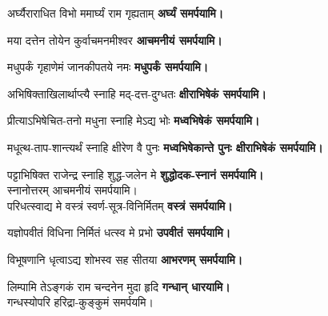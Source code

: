 \begin{center}
{अर्घ्यैराराधित विभो ममार्घ्यं राम गृह्यताम्}
\textbf{\devAya{} अर्घ्यं समर्पयामि।\\}

{मया दत्तेन तोयेन कुर्वाचमनमीश्वर}
\textbf{\devAya{} आचमनीयं समर्पयामि।\\}

{मधुपर्कं गृहाणेमं जानकीपतये नमः}
\textbf{\devAya{} मधुपर्कं समर्पयामि।\\}

{अभिषिक्ताखिलार्थाप्त्यै स्नाहि मद्-दत्त-दुग्धतः}
\textbf{\devAya{} क्षीराभिषेकं समर्पयामि।\\}

{प्रीत्याऽभिषेचित-तनो मधुना स्नाहि मेऽद्य भोः}
\textbf{\devAya{} मध्वभिषेकं समर्पयामि।\\}

{मधूत्थ-ताप-शान्त्यर्थं स्नाहि क्षीरेण वै पुनः}
\textbf{\devAya{} मध्वभिषेकान्ते पुनः क्षीराभिषेकं समर्पयामि।\\}

{पट्टाभिषिक्त राजेन्द्र स्नाहि शुद्ध-जलेन मे}
\textbf{\devAya{} शुद्धोदक-स्नानं समर्पयामि।\\}
स्नानोत्तरम् आचमनीयं समर्पयामि।\\

{परिधत्स्वाद्य मे वस्त्रं स्वर्ण-सूत्र-विनिर्मितम्}
\textbf{\devAya{} वस्त्रं समर्पयामि।\\}

{यज्ञोपवीतं विधिना निर्मितं धत्स्व मे प्रभो}
\textbf{\devAya{} उपवीतं समर्पयामि।\\}

{विभूषणानि धृत्वाऽद्य शोभस्व सह सीतया}
\textbf{\devAya{} आभरणम् समर्पयामि।\\}

{लिम्पामि तेऽङ्गकं राम चन्दनेन मुदा हृदि}
\textbf{\devAya{} गन्धान् धारयामि।\\}
गन्धस्योपरि हरिद्रा-कुङ्कुमं समर्पयमि।\\


\end{center}
